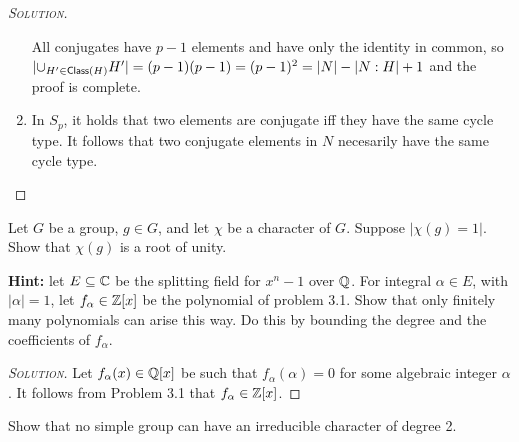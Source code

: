 \begin{proof}[{\scshape Solution}]
\begin{enumerate}[font=\normalfont,label=\textbf{(\Alph*)}, wide]
    All conjugates have $p-1$ elements and have only the identity in common, so $\lvert \cup_{H' \in \mathsf{Class}(H)} H' \rvert = (p-1)(p-1) = (p-1)^2 = \lvert N \rvert - \lvert N : H\rvert + 1$ and the proof is complete.

    \item

    In $S_p$, it holds that two elements are conjugate iff they have the same cycle type. It follows that two conjugate elements in $N$ necesarily have the same cycle type.
  \end{enumerate}
\end{proof}

\newpage

\begin{problem}[Isaacs 3.2]
Let $G$ be a group, $g \in G$, and let $\chi$ be a character of $G$. Suppose $\lvert \chi(g) = 1 \rvert$. Show that $\chi(g)$ is a root of unity.

\noindent\textbf{Hint:} let $E \subseteq \mathbb{C}$ be the splitting field for $x^n-1$ over $\mathbb{Q}$. For integral $\alpha \in E$, with $\lvert \alpha \rvert = 1$, let $f_\alpha \in \mathbb{Z}[x]$ be the polynomial of problem 3.1. Show that only finitely many polynomials can arise this way. Do this by bounding the degree and the coefficients of $f_\alpha$.
\end{problem}

\begin{proof}[{\scshape Solution}]
Let $f_\alpha(x) \in \mathbb{Q}[x]$ be such that $f_\alpha(\alpha) = 0$ for some algebraic integer $\alpha$. It follows from Problem 3.1 that $f_\alpha \in \mathbb{Z}[x]$.
\end{proof}

\newpage

\begin{problem}[Isaacs 3.3] Show that no simple group can have an irreducible character of degree 2.

\end{problem}

